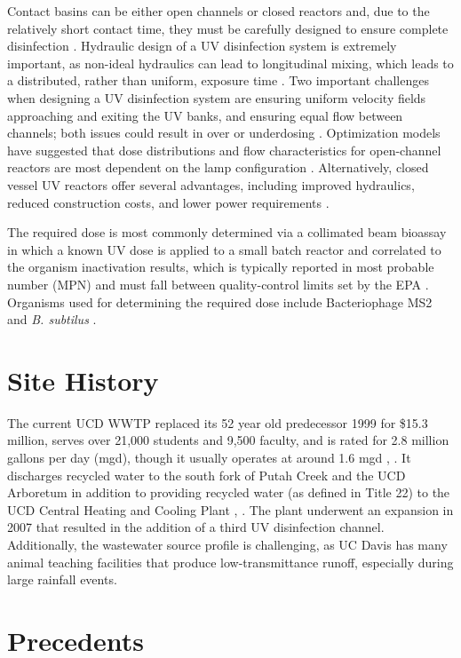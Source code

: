 \documentclass[11pt,letterpaper,final]{report}
\begin{document}
Contact basins can be either open channels or closed reactors and, due to the relatively short contact time, they must be carefully designed to ensure complete disinfection \cite{Metcalf}. Hydraulic design of a UV disinfection system is extremely important, as non-ideal hydraulics can lead to longitudinal mixing, which leads to a distributed, rather than uniform, exposure time \cite{Metcalf}. Two important challenges when designing a UV disinfection system are ensuring uniform velocity fields approaching and exiting the UV banks, and ensuring equal flow between channels; both issues could result in over or underdosing \cite{Metcalf}. Optimization models have suggested that dose distributions and flow characteristics for open-channel reactors are most dependent on the lamp configuration \cite{Sultan2019}. Alternatively, closed vessel UV reactors offer several advantages, including improved hydraulics, reduced construction costs, and lower power requirements \cite{Evoqua}. 

The required dose is most commonly determined via a collimated beam bioassay in which a known UV dose is applied to a small batch reactor and correlated to the organism inactivation results, which is typically reported in most probable number (MPN) and must fall between quality-control limits set by the EPA \cite{Metcalf}. Organisms used for determining the required dose include Bacteriophage MS2 and \textit{B. subtilus} \cite{Metcalf}.

\section{Site History}

The current UCD WWTP replaced its 52 year old predecessor 1999 for \$15.3 million, serves over 21,000 students and 9,500 faculty, and is rated for 2.8 million gallons per day (mgd), though it usually operates at around 1.6 mgd \cite{Kerlin}, \cite{Facilities}. It discharges recycled water to the south fork of Putah Creek and the UCD Arboretum in addition to providing recycled water (as defined in Title 22) to the UCD Central Heating and Cooling Plant \cite{NPDES}, \cite{DaveJones}. The plant underwent an expansion in 2007 that resulted in the addition of a third UV disinfection channel. Additionally, the wastewater source profile is challenging, as UC Davis has many animal teaching facilities that produce low-transmittance runoff, especially during large rainfall events.


\section{Precedents}
\end{document}
